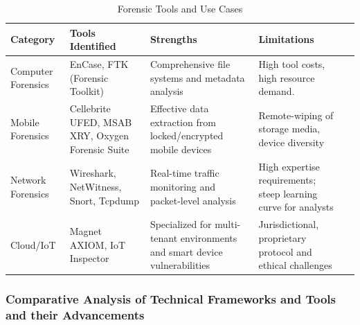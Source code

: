 \documentclass[12pt,a4paper]{article}
\begin{document}
\begin{table}[H]
\caption{Forensic Tools and Use Cases}
\label{tab:inclusion-exclusion}

\fontsize{10pt}{12pt}\selectfont
\begin{tabularx}{\textwidth}{|p{3cm}|X|X|X|X|}
\hline
\centering\textbf {Category} &
\centering\textbf{Tools Identified} &
\centering\textbf{Strengths} & 
\centering\textbf{Limitations}
\tabularnewline
\hline

\centering Computer Forensics &
\centering EnCase, FTK (Forensic Toolkit) &
\centering Comprehensive file systems and metadata analysis & 
\centering High tool costs, high resource demand.
\tabularnewline
\hline

\centering Mobile Forensics &
\centering Cellebrite UFED, MSAB XRY, Oxygen Forensic Suite &
\centering Effective data extraction from locked/encrypted mobile devices & 
\centering Remote-wiping of storage media, device diversity
\tabularnewline
\hline

\centering Network Forensics &
\centering Wireshark, NetWitness, Snort, Tcpdump &
\centering Real-time traffic monitoring and packet-level analysis & 
\centering High expertise requirements; steep learning curve for analysts
\tabularnewline
\hline

\centering Cloud/IoT &
\centering Magnet AXIOM, IoT Inspector &
\centering Specialized for multi-tenant environments and smart device vulnerabilities & 
\centering Jurisdictional, proprietary protocol and ethical challenges
\tabularnewline
\hline

\end{tabularx}
\end{table}

\subsubsection{Comparative Analysis of Technical Frameworks and Tools and their Advancements}
\end{document}
